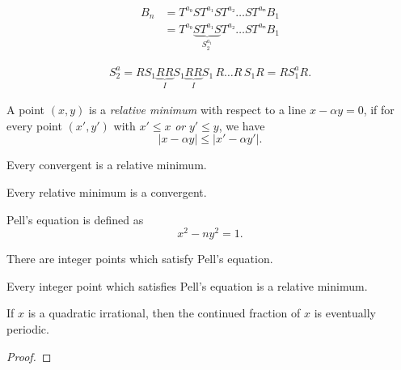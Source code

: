 \begin{align*}
  B_n & = T^{a₀} S T^{a₁} S T^{a₂} … S T^{aₙ} B_1 \\
      & = T^{a₀} \underbrace{S T^{a₁} S}_{S_2^{a_1}} T^{a₂} … S T^{aₙ} B_1
\end{align*}

\begin{align*}
  S_2^a = R S_1 \underbrace{R R}_{I} S_1 \underbrace{R R}_I S_1\, R … R\, S_1 R = R S_1^{a} R.
\end{align*}

\begin{definition}
  A point $(x, y)$ is a \emph{relative minimum} with respect to a line $x - α y = 0$,
  if for every point $(x', y')$ with $x' ≤ x$ \emph{or} $y' ≤ y$, we have
  \[
    |x - α y| ≤ |x' - α y'|.
  \]
\end{definition}

\begin{lemma}
  Every convergent is a relative minimum.
\end{lemma}

\begin{lemma}
  Every relative minimum is a convergent.
\end{lemma}

Pell's equation is defined as
\[
  x^2 - n y^2 = 1.
\]

\begin{lemma}
  There are integer points which satisfy Pell's equation.
\end{lemma}

\begin{lemma}
  Every integer point which satisfies Pell's equation is a relative minimum.
\end{lemma}

\begin{theorem}
  If $x$ is a quadratic irrational,
  then the continued fraction of $x$ is eventually periodic.
\end{theorem}

\begin{proof}

\end{proof}
